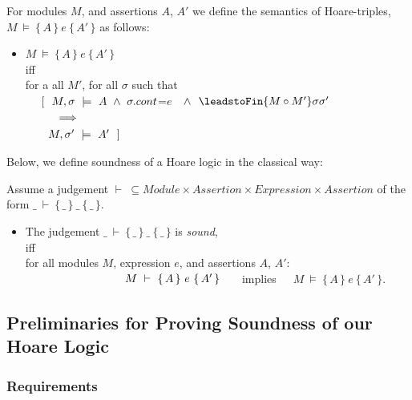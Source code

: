 \begin{definition}

 
For modules $M$, and assertions $A$, $A'$   we define the semantics of Hoare-triples, 
 $M\ \models\  \{\, A \,  \}\ e\  \{\, A' \, \}$ as follows:
\begin{itemize}
\item
$M\ \models\  \{\, A \,  \}\ e\  \{\, A' \, \}$ \\
iff\\
 for a all $M'$, for all $\sigma$ such that  \\
$\strut ~ ~ ~ ~ [ \ \ M,\sigma \ \models \ A \ \wedge\  
 \sigma.cont$=$e$ $\ \ \wedge\  \ \leadstoFin  {M\circ M'} \sigma {\sigma'}$
 \\
$\strut ~ ~ ~ ~ \ \  \ \ \Longrightarrow$ \\
$\strut ~ ~ ~ ~ \ \ M,\sigma' \ \models \ A'\ \ ]$
\end{itemize}
\end{definition}
 

Below, we define soundness of a Hoare logic in the classical way:

\begin{definition}

 
Assume a judgement $\vdash \ \subseteq Module \times Assertion \times Expression \times Assertion$ of the form
$\_ \ \vdash\  \{\, \_ \,  \}\ \_ \  \{\, \_ \, \}$.\\
\begin{itemize}
\item
The judgement $\_ \ \vdash\  \{\, \_ \,  \}\ \_ \  \{\, \_ \, \}$ is {\emph {sound}}, \\ iff \\
for all modules $M$, expression $e$, and assertions $A$, $A'$:\\
$\strut\hspace{3cm} \ M\ \vdash\  \{\, A \,  \}\ e\  \{\, A' \, \}$ \ \ \  implies\ \ \ 
 $M\ \models\  \{\, A \,  \}\ e\  \{\, A' \, \}$.
\end{itemize}
 \end{definition}
 
 
 \subsection{Preliminaries for Proving Soundness of our Hoare Logic}
 
 \subsubsection{Requirements}
 
